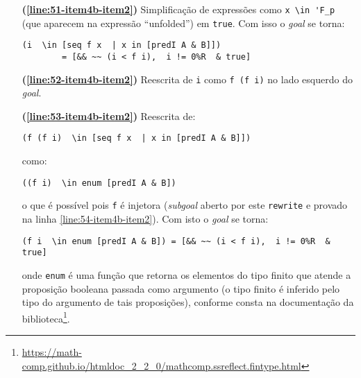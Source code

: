 \begin{enumerate}[label=\textbf{\roman*.}]
\begin{enumerate}[label=\textbf{\roman{enumi}.(\alph*)}]
\begin{enumerate}[label=\textbf{(\alph{enumii}.\arabic*)}]
\begin{enumerate}[listparindent=\parindent]
\begin{itemize}
                                                \item[\textbf{(\ref{line:51-item4b-item2})}] Simplificação de expressões como \lstinline[language=coq]|x \in 'F_p| (que aparecem na expressão ``unfolded'') em \lstinline[language=coq]|true|. Com isso o \textit{goal} se torna:
                                                        \begin{lstlisting}[language=coq,frame=single,tabsize=1]
(i  \in [seq f x  | x in [predI A & B]]) 
        = [&& ~~ (i < f i),  i != 0%R  & true]
                                                        \end{lstlisting}
                                                        
                                                \item[\textbf{(\ref{line:52-item4b-item2})}] Reescrita de \lstinline[language=coq]|i| como \lstinline[language=coq]|f (f i)| no lado esquerdo do \textit{goal}.
                                                
                                                \item[\textbf{(\ref{line:53-item4b-item2})}] Reescrita de:
                                                        \begin{lstlisting}[language=coq,frame=single,tabsize=1]
(f (f i)  \in [seq f x  | x in [predI A & B]])
                                                        \end{lstlisting}
                                                como:
                                                        \begin{lstlisting}[language=coq,frame=single,tabsize=1]
((f i)  \in enum [predI A & B])
                                                        \end{lstlisting}
                                                o que é possível pois \lstinline[language=coq]|f| é injetora (\textit{subgoal} aberto por este \lstinline[language=coq]|rewrite| e provado na linha \ref{line:54-item4b-item2}). Com isto o
                                                \textit{goal} se torna:
                                                        \begin{lstlisting}[language=coq,frame=single,tabsize=1]
(f i  \in enum [predI A & B]) = [&& ~~ (i < f i),  i != 0%R  & true]
                                                        \end{lstlisting}
                                                onde \lstinline[language=coq]|enum| é uma função que retorna os elementos do tipo finito que atende a proposição booleana passada como argumento (o tipo finito é inferido pelo tipo do argumento de tais proposições), conforme consta na documentação da biblioteca\footnote{\url{https://math-comp.github.io/htmldoc_2_2_0/mathcomp.ssreflect.fintype.html}}.


\end{itemize}
\end{enumerate}
\end{enumerate}
\end{enumerate}
\end{enumerate}
